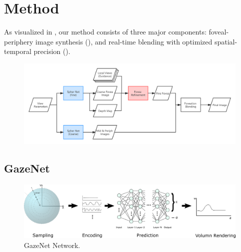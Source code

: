 \section{Method}
\label{sec:method}
As visualized in , our method consists of three major components: foveal-periphery image synthesis (), and real-time blending with optimized spatial-temporal precision ().

\begin{figure}[htb]
    \centering
    \includegraphics[width=\linewidth]{TOG/figs/sys_pipeline.png}
    {%
    }
    \label{fig:pipeline}
\end{figure}


\subsection{GazeNet}
\label{sec:method:net}
\begin{figure}[htb]
    \centering
    \includegraphics[width=\linewidth]{TOG/figs/spher_net_flow.png}
    \caption{GazeNet Network.}
    \label{fig:my_label}
\end{figure}


